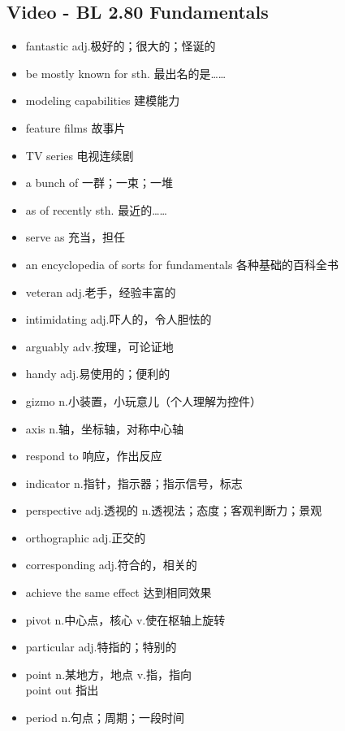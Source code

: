 \documentclass[11pt,a4paper,UTF8,titlepage]{ctexrep} %
\begin{document}
    \subsection{Video - BL 2.80 Fundamentals}
    \begin{multicols}{2}
        \begin{itemize}
            \item fantastic adj.极好的；很大的；怪诞的
            \item be mostly known for sth. 最出名的是……
            \item modeling capabilities 建模能力
            \item feature films 故事片
            \item TV series 电视连续剧
            \item a bunch of 一群；一束；一堆
            \item as of recently sth. 最近的……
            \item serve as 充当，担任
            \item an encyclopedia of sorts for fundamentals 各种基础的百科全书
            \item veteran adj.老手，经验丰富的
            \item intimidating adj.吓人的，令人胆怯的
            \item arguably adv.按理，可论证地
            \item handy adj.易使用的；便利的
            \item gizmo n.小装置，小玩意儿（个人理解为控件）
            \item axis n.轴，坐标轴，对称中心轴
            \item respond to 响应，作出反应
            \item indicator n.指针，指示器；指示信号，标志
            \item perspective adj.透视的 n.透视法；态度；客观判断力；景观
            \item orthographic adj.正交的
            \item corresponding adj.符合的，相关的
            \item achieve the same effect 达到相同效果
            \item pivot n.中心点，核心 v.使在枢轴上旋转
            \item particular adj.特指的；特别的
            \item point n.某地方，地点 v.指，指向\\point out 指出
            \item period n.句点；周期；一段时间

\end{itemize}
\end{multicols}
\end{document}

